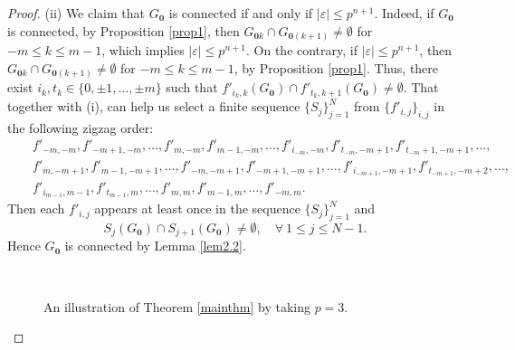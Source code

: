 \documentclass[12pt, reqno]{amsart}
\numberwithin{equation}{section}
\begin{document}
\begin{proof}
(ii) We claim that $G_{\mathbf 0}$ is connected if and only if $|\varepsilon|\leq p^{n+1}$. Indeed, if $G_{\mathbf 0}$ is connected,  by Proposition \ref{prop1},  then $G_{{\mathbf 0}k}\cap G_{{\mathbf 0} (k+1)}\neq\emptyset$ for  $-m\leq k\leq m-1$, which implies $|\varepsilon|\leq p^{n+1}$. On the contrary, if $|\varepsilon|\leq p^{n+1}$, then $G_{\mathbf 0k}\cap G_{\mathbf 0 (k+1)}\neq\emptyset$ for $-m\leq k\leq m-1$,  by Proposition \ref{prop1}. Thus, there exist $i_k,t_k\in\{0,\pm 1,\dots,\pm m\}$ such that $f'_{i_k,k}(G_{\mathbf 0})\cap f'_{t_k,k+1}(G_{\mathbf 0})\neq\emptyset$. That together with (i), can help us select a finite sequence $\{S_j\}_{j=1}^N$ from $\{f'_{i,j}\}_{i,j}$  in the following zigzag order:
\begin{eqnarray*}
& & f'_{-m,-m},f'_{-m+1,-m},\dots,f'_{m,-m},f'_{m-1,-m},\dots,f'_{i_{-m},-m},f'_{t_{-m},-m+1},f'_{t_{-m}+1,-m+1},\dots,\\
& & f'_{m,-m+1},f'_{m-1,-m+1},\dots,f'_{-m,-m+1},f'_{-m+1,-m+1},\dots,f'_{i_{-m+1},-m+1},f'_{t_{-m+1},-m+2},\dots,\\
& & f'_{i_{m-1},m-1},f'_{t_{m-1},m},\dots,f'_{m,m},f'_{m-1,m},\dots,f'_{-m,m}.
\end{eqnarray*}
Then each $f'_{i,j}$ appears at least once in the sequence  $\{S_j\}_{j=1}^N$ and $$S_j(G_{\mathbf 0})\cap S_{j+1}(G_{\mathbf 0})\ne\emptyset, \quad  \forall \ 1\le j\le N-1.$$ 
Hence $G_{\mathbf 0}$ is connected by Lemma \ref{lem2.2}.




\begin{figure}
  \centering
    \quad
  \quad
 \\
  \quad
 \quad
 \caption{An illustration of Theorem \ref{mainthm} by taking $p=3$.}\label{fig1}
\end{figure}




\end{proof}
\end{document}
